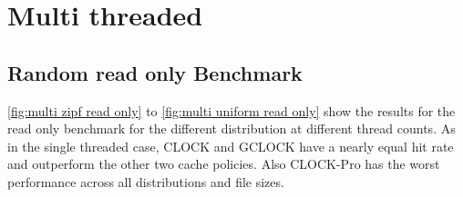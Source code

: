 \documentclass[
	12pt,
	a4paper,
	abstract,
	bibliography=totoc,
	chapterprefix,
	headings=openright,
	numbers=endperiod,
	parskip=half,
	twoside,
]{scrreprt}
\begin{document}



\section{Multi threaded}
\subsection{Random read only Benchmark}

\cref{fig:multi zipf read only} to \cref{fig:multi uniform read only}
show the results for the read only benchmark for the different distribution at different thread counts.
As in the single threaded case, CLOCK and GCLOCK have a nearly equal hit rate and outperform the other two cache policies.
Also CLOCK-Pro has the worst performance across all distributions and file sizes.
\end{document}
